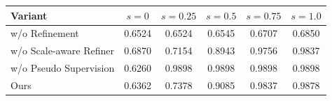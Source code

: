 \begin{tabular}{l|ccccc}
\toprule
Variant & $s=0$ & $s=0.25$ & $s=0.5$ & $s=0.75$ & $s=1.0$ \\
\midrule
w/o Refinement & 0.6524 & 0.6524 & 0.6545 & 0.6707 & 0.6850 \\
w/o Scale-aware Refiner & 0.6870 & 0.7154 & 0.8943 & 0.9756 & 0.9837 \\
w/o Pseudo Supervision & 0.6260 & 0.9898 & 0.9898 & 0.9898 & 0.9898 \\
Ours & 0.6362 & 0.7378 & 0.9085 & 0.9837 & 0.9878 \\
\bottomrule
\end{tabular}
